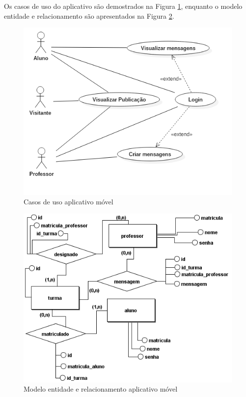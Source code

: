 Os casos de uso do aplicativo são demostrados na Figura \ref{fig:casosdeusomobile}, enquanto o modelo entidade e relacionamento são apresentados na Figura \ref{fig:entidaderelacionamentomobile}.
\begin{figure}[H]
\centering
\includegraphics[scale=0.7]{figuras/CasosDeUsoMobile}
\caption{Casos de uso aplicativo móvel}
\label{fig:casosdeusomobile}
\end{figure}

\begin{figure}[H]
\centering
\includegraphics[width=\textwidth]{figuras/entidaderelacionamentomobile}
\caption{Modelo entidade e relacionamento aplicativo móvel}
\label{fig:entidaderelacionamentomobile}
\end{figure}

